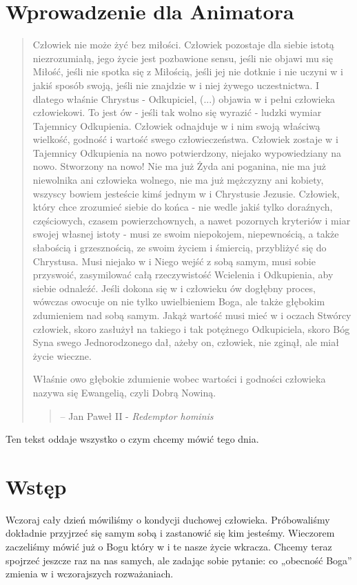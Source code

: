 \documentclass[a5paper,10pt,polish]{book}
\begin{document}
\section{Wprowadzenie dla Animatora}
\label{babice2006-wiosna-knurow/spotkanie2:wprowadzenie-dla-animatora}\begin{quote}

Człowiek nie może żyć bez miłości. Człowiek pozostaje dla siebie istotą  niezrozumiałą,  jego życie jest pozbawione  sensu, jeśli nie objawi mu się Miłość, jeśli nie spotka się z Miłością, jeśli jej nie dotknie i nie  uczyni  w i jakiś  sposób swoją,  jeśli  nie  znajdzie w i niej żywego uczestnictwa.  I dlatego właśnie Chrystus - Odkupiciel,  (...)  objawia w i pełni  człowieka  człowiekowi.  To jest ów - jeśli tak wolno się wyrazić - ludzki wymiar Tajemnicy Odkupienia.  Człowiek  odnajduje w i nim swoją właściwą wielkość, godność i wartość swego człowieczeństwa.  Człowiek zostaje w i Tajemnicy Odkupienia na nowo potwierdzony, niejako wypowiedziany na nowo. Stworzony na nowo! Nie ma już Żyda ani poganina, nie ma już niewolnika ani człowieka wolnego, nie ma już mężczyzny ani kobiety, wszyscy bowiem jesteście kimś jednym w i Chrystusie Jezusie. Człowiek, który chce zrozumieć siebie do końca - nie wedle jakiś tylko doraźnych, częściowych, czasem powierzchownych, a nawet pozornych kryteriów i miar swojej własnej istoty  - musi ze swoim niepokojem, niepewnością, a także słabością i grzesznością,  ze swoim życiem i śmiercią, przybliżyć się do Chrystusa. Musi niejako w i Niego wejść z sobą  samym, musi sobie przyswoić, zasymilować całą rzeczywistość Wcielenia i Odkupienia,  aby siebie odnaleźć. Jeśli dokona się w i człowieku ów dogłębny proces, wówczas owocuje on nie tylko uwielbieniem Boga, ale także głębokim  zdumieniem  nad sobą samym. Jakąż wartość musi mieć w i oczach Stwórcy człowiek,  skoro zasłużył na takiego i tak potężnego Odkupiciela, skoro  Bóg Syna swego Jednorodzonego dał, ażeby on, człowiek, nie zginął, ale miał życie wieczne.

Właśnie owo głębokie zdumienie  wobec wartości i godności człowieka nazywa się Ewangelią, czyli Dobrą Nowiną.
\begin{quote}

--  Jan Paweł II - \emph{Redemptor hominis}
\end{quote}
\end{quote}

Ten tekst oddaje wszystko o czym chcemy mówić tego dnia.


\section{Wstęp}
\label{babice2006-wiosna-knurow/spotkanie2:wstep}
Wczoraj  cały dzień mówiliśmy o kondycji duchowej  człowieka. Próbowaliśmy dokładnie przyjrzeć się  samym sobą i zastanowić się kim jesteśmy. Wieczorem zaczeliśmy mówić już o Bogu który w i te nasze życie wkracza. Chcemy teraz spojrzeć jeszcze raz na nas samych, ale zadając sobie pytanie: co „obecność Boga” zmienia w i wczorajszych rozważaniach.
\end{document}
